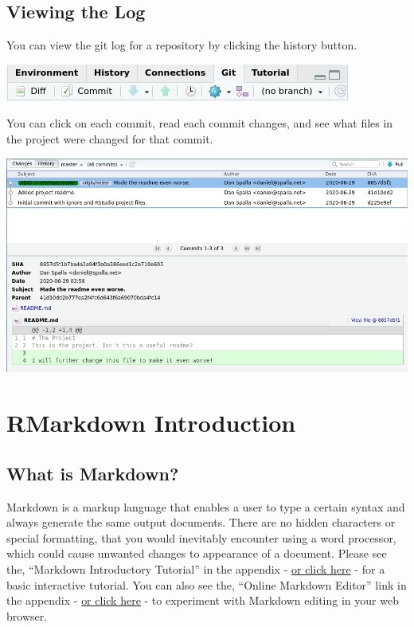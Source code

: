 \documentclass[
]{book}
\begin{document}
\hypertarget{viewing-the-log}{%
\section{Viewing the Log}\label{viewing-the-log}}

You can view the git log for a repository by clicking the history button.

\includegraphics{images/02-commit_1.png}

You can click on each commit, read each commit changes, and see what files in the project were changed for that commit.

\includegraphics{images/02-log_1.png}

\hypertarget{rmarkdown-introduction}{%
\chapter{RMarkdown Introduction}\label{rmarkdown-introduction}}

\hypertarget{what-is-markdown}{%
\section{What is Markdown?}\label{what-is-markdown}}

Markdown is a markup language that enables a user to type a certain syntax and always generate the same output documents. There are no hidden characters or special formatting, that you would inevitably encounter using a word processor, which could cause unwanted changes to appearance of a document. Please see the, ``Markdown Introductory Tutorial'' in the appendix - \href{https://www.markdowntutorial.com/lesson/1/}{or click here} - for a basic interactive tutorial. You can also see the, ``Online Markdown Editor'' link in the appendix - \href{https://markdown-editor.github.io/}{or click here} - to experiment with Markdown editing in your web browser.
\end{document}
